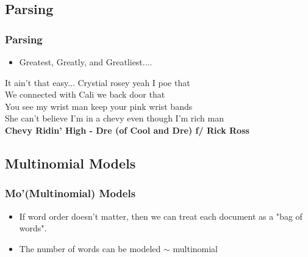 \documentclass[presentation]{beamer}
\begin{document}
\subsection{Parsing}

\begin{frame}
\frametitle{Parsing}
\pause
\begin{itemize}
\item Greatest, Greatly, and Greatliest.... 
\pause
\end{itemize}
\begin{block}{It ain't that easy...}
\pause
Crystial rosey yeah I poe that \\
We connected with Cali we back door that \\
\pause
You see my wrist man keep your pink wrist bands \\ 
She can't believe I'm in a chevy even though I'm rich man \\
\pause
\textbf{Chevy Ridin' High - Dre (of Cool and Dre) f/ Rick Ross}
\end{block}
\end{frame}

\subsection{Multinomial Models}
\begin{frame}
\pause
\frametitle{Mo'(Multinomial) Models}
\begin{itemize}
\item If word order doesn't matter, then we can treat each document as a "bag of words". 
\pause
\item The number of words can be modeled $\sim$ multinomial
\pause
\end{itemize}
\begin{table}[!hbpt]
\caption{Creating a word-count matrix from text}
\begin{center} 
\end{center}
\end{table} 
\end{frame}
\end{document}
